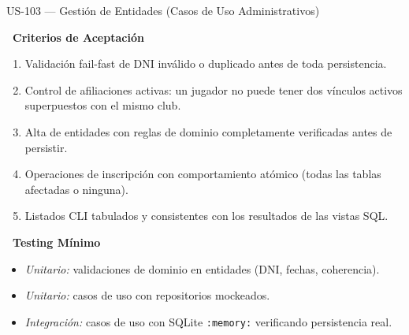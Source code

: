 \documentclass[11pt,a4paper]{article}
\newcommand{\fpath}[1]{\texttt{\small #1}}
\newcommand{\usfield}[2][\;]{%
  \par\vspace{5pt}%
  {\small\textbf{\textcolor{primary}{#2}}}\par\vspace{2pt}%
}
\begin{document}
\begin{uscard}{US-103 — Gestión de Entidades (Casos de Uso Administrativos)}
\usfield{\faCheckCircle\ Criterios de Aceptación}
\begin{enumerate}[label=\textcolor{accent}{\textbf{AC\arabic*.}}, nosep, leftmargin=2.2em]
  \item Validación fail-fast de DNI inválido o duplicado antes de toda persistencia.
  \item Control de afiliaciones activas: un jugador no puede tener dos vínculos activos superpuestos con el mismo club.
  \item Alta de entidades con reglas de dominio completamente verificadas antes de persistir.
  \item Operaciones de inscripción con comportamiento atómico (todas las tablas afectadas o ninguna).
  \item Listados CLI tabulados y consistentes con los resultados de las vistas SQL.
\end{enumerate}

\usfield{\faFlask\ Testing Mínimo}
\begin{itemize}[nosep, leftmargin=1.6em]
  \item \textit{Unitario:} validaciones de dominio en entidades (DNI, fechas, coherencia).
  \item \textit{Unitario:} casos de uso con repositorios mockeados.
  \item \textit{Integración:} casos de uso con SQLite \fpath{:memory:} verificando persistencia real.
\end{itemize}

\end{uscard}
\end{document}
